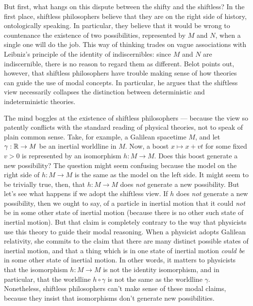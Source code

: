 But first, what hangs on this dispute between the shifty and the
shiftless?  In the first place, shiftless philosophers believe that
they are on the right side of history, ontologically speaking.  In
particular, they believe that it would be wrong to countenance the
existence of two possibilities, represented by $M$ and $N$, when a
single one will do the job.  This way of thinking trades on vague
associations with Leibniz's principle of the identity of
indiscernibles: since $M$ and $N$ are indiscernible, there is no
reason to regard them as different.  Belot points out, however, that
shiftless philosophers have trouble making sense of how theories can
guide the use of modal concepts.  In particular, he argues that the
shiftless view necessarily collapses the distinction between
deterministic and indeterministic theories.

The mind boggles at the existence of shiftless philosophers ---
because the view so patently conflicts with the standard reading of
physical theories, not to speak of plain common sense.  Take, for
example, a Galilean spacetime $M$, and let $\gamma :\mathbb R\to M$ be an
inertial worldline in $M$.  Now, a boost $x\mapsto x+vt$ for some
fixed $v>0$ is represented by an isomorphism $h:M\to M$.  Does this
boost generate a new possibility?  The question might seem confusing
because the model on the right side of $h:M\to M$ is the same as the
model on the left side.  It might seem to be trivially true, then,
that $h:M\to M$ does {\it not} generate a new possibility.  But let's
see what happens if we adopt the shiftless view.  If $h$ does {\it
  not} generate a new possibility, then we ought to say, of a particle
in inertial motion that it could {\it not} be in some other state of
inertial motion (because there is no other such state of inertial
motion).  But that claim is completely contrary to the way that
physicists use this theory to guide their modal reasoning.  When a
physicist adopts Galilean relativity, she commits to the claim that
there are many distinct possible states of inertial motion, and that a
thing which is in one state of inertial motion {\it could be} in some
other state of inertial motion.  In other words, it matters to
physicists that the isomorphism $h:M\to M$ is not the identity
isomorphism, and in particular, that the worldline $h\circ \gamma$ is
not the same as the worldline $\gamma$.  Nonetheless, shiftless
philosophers can't make sense of these modal claims, because they
insist that isomorphisms don't generate new possibilities.

